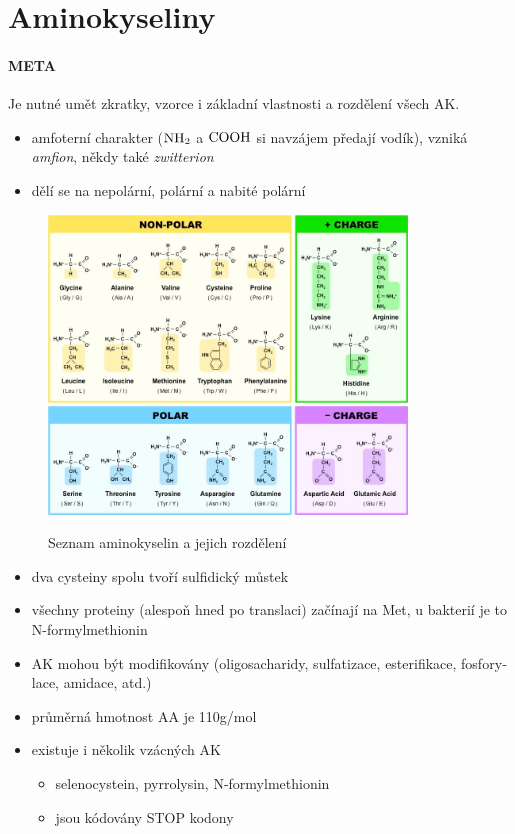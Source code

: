 \documentclass[DIV=8]{scrreprt}
\newcommand{\mybox}[2]{
    \paragraph{#1} #2
}
\begin{document}
\section{Aminokyseliny} \label{Aminokyseliny}


\mybox{META}{Je nutné umět zkratky, vzorce i základní vlastnosti a rozdělení všech AK.}


\begin{itemize}[nosep]
    \item amfoterní charakter (\(\ce{NH2}\) a \(\ce{COOH}\) si navzájem předají vodík), vzniká \emph{amfion}, někdy také \emph{zwitterion}
    \item dělí se na nepolární, polární a nabité polární
\end{itemize}



\begin{figure}
    \caption{Seznam aminokyselin a jejich rozdělení}
    \includegraphics[width=0.85\textwidth]{ak.jpeg}
    \centering
    \label{}
\end{figure}


\begin{itemize}[nosep]
    \item dva cysteiny spolu tvoří sulfidický můstek
    \item všechny proteiny (alespoň hned po translaci) začínají na Met, u bakterií je to N-formylmethionin
    \item AK mo­hou být mod­i­fikovány (oligosacharidy, sul­fa­ti­zace, es­ter­i­fikace, fos­fory­lace, ami­dace, atd.)
    \item průměrná hmot­nost AA je 110g/mol
    \item existuje i několik vzácných AK
\begin{itemize}[nosep]
    \item selenocystein, pyrrolysin, N-formylmethionin
    \item jsou kódovány STOP kodony
\end{itemize}

\end{itemize}
\end{document}
